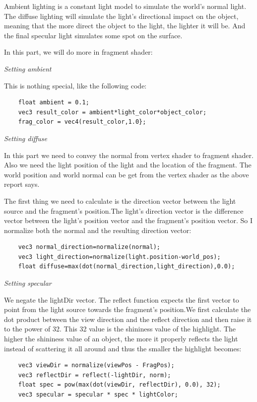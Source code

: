 \documentclass[acmtog]{acmart}
\begin{document}
Ambient lighting is a constant light model to simulate the world's normal light. The diffuse lighting will simulate the light's directional impact on the object, meaning that the more direct the object to the light, the lighter it will be. And the final specular light simulates some spot on the surface.

In this part, we will do more in fragment shader:

\textcolor[rgb]{1,0,0}{\textit{Setting ambient}}

This is nothing special, like the following code:

\begin{lstlisting}
	float ambient = 0.1;
	vec3 result_color = ambient*light_color*object_color;
	frag_color = vec4(result_color,1.0};
\end{lstlisting}

\textcolor[rgb]{1,0,0}{\textit{Setting diffuse}}

In this part we need to convey the normal from vertex shader to fragment shader. Also we need the light position of the light and the location of the fragment. The world position and world normal can be get from the vertex shader as the above report says.

The first thing we need to calculate is the direction vector between the light source and the fragment's position.The light's direction vector is the difference vector between the light's position vector and the fragment's position vector. So I normalize both the normal and the resulting direction vector:

\begin{lstlisting}
	vec3 normal_direction=normalize(normal);
    vec3 light_direction=normalize(light.position-world_pos); 
    float diffuse=max(dot(normal_direction,light_direction),0.0);
\end{lstlisting}

\textcolor[rgb]{1,0,0}{\textit{Setting specular}}

We negate the lightDir vector. The reflect function expects the first vector to point from the light source towards the fragment's position.We first calculate the dot product between the view direction and the reflect direction and then raise it to the power of 32. This 32 value is the shininess value of the highlight. The higher the shininess value of an object, the more it properly reflects the light instead of scattering it all around and thus the smaller the highlight becomes:

\begin{lstlisting}
	vec3 viewDir = normalize(viewPos - FragPos);
    vec3 reflectDir = reflect(-lightDir, norm);
    float spec = pow(max(dot(viewDir, reflectDir), 0.0), 32);
    vec3 specular = specular * spec * lightColor; 
\end{lstlisting}
\end{document}
